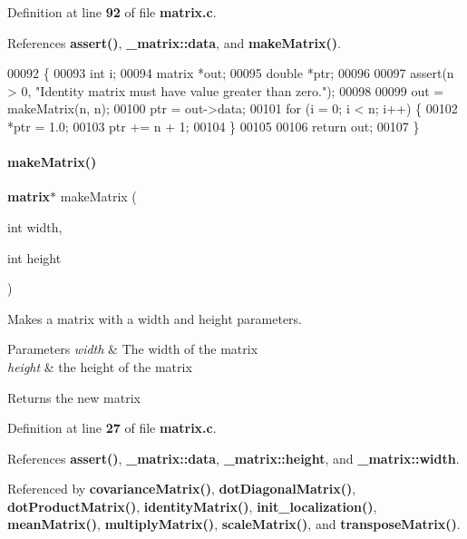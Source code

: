 Definition at line \textbf{ 92} of file \textbf{ matrix.\+c}.



References \textbf{ assert()}, \textbf{ \+\_\+matrix\+::data}, and \textbf{ make\+Matrix()}.


\begin{DoxyCode}
00092                               \{
00093   \textcolor{keywordtype}{int} i;
00094   matrix *out;
00095   \textcolor{keywordtype}{double} *ptr;
00096 
00097   assert(n > 0, \textcolor{stringliteral}{"Identity matrix must have value greater than zero."});
00098 
00099   out = makeMatrix(n, n);
00100   ptr = out->data;
00101   \textcolor{keywordflow}{for} (i = 0; i < n; i++) \{
00102     *ptr = 1.0;
00103     ptr += n + 1;
00104   \}
00105 
00106   \textcolor{keywordflow}{return} out;
00107 \}
\end{DoxyCode}
\mbox{\label{a00125_aae8b56c6fb44d9147b835f4006ca872c}} 
\paragraph{make\+Matrix()}
{\footnotesize\ttfamily \textbf{ matrix}$\ast$ make\+Matrix (\begin{DoxyParamCaption}\item[{int}]{width,  }\item[{int}]{height }\end{DoxyParamCaption})}



Makes a matrix with a width and height parameters. 


\begin{DoxyParams}{Parameters}
{\em width} & The width of the matrix \\
\hline
{\em height} & the height of the matrix \\
\hline
\end{DoxyParams}
\begin{DoxyReturn}{Returns}
the new matrix 
\end{DoxyReturn}


Definition at line \textbf{ 27} of file \textbf{ matrix.\+c}.



References \textbf{ assert()}, \textbf{ \+\_\+matrix\+::data}, \textbf{ \+\_\+matrix\+::height}, and \textbf{ \+\_\+matrix\+::width}.



Referenced by \textbf{ covariance\+Matrix()}, \textbf{ dot\+Diagonal\+Matrix()}, \textbf{ dot\+Product\+Matrix()}, \textbf{ identity\+Matrix()}, \textbf{ init\+\_\+localization()}, \textbf{ mean\+Matrix()}, \textbf{ multiply\+Matrix()}, \textbf{ scale\+Matrix()}, and \textbf{ transpose\+Matrix()}.


